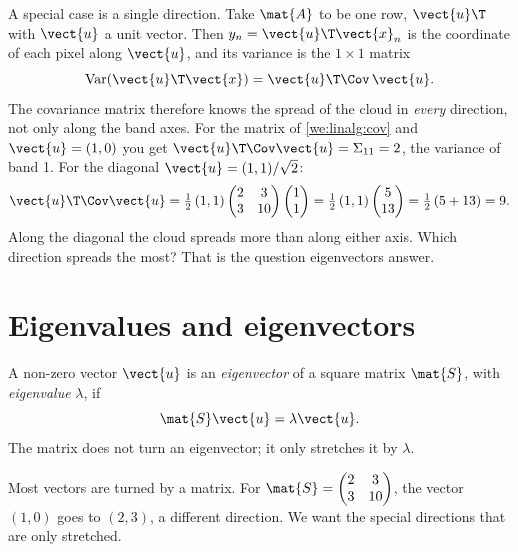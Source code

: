 A special case is a single direction. Take $\mat{A}$ to be one row, $\vect{u}\T$ with $\vect{u}$ a
unit vector. Then $y_n = \vect{u}\T\vect{x}_n$ is the coordinate of each pixel along $\vect{u}$,
and its variance is the $1\times1$ matrix
\begin{equation}\label{eq:linalg:dirvar}
\operatorname{Var}(\vect{u}\T\vect{x}) = \vect{u}\T\Cov\,\vect{u}.
\end{equation}
The covariance matrix therefore knows the spread of the cloud in \emph{every} direction, not only
along the band axes. For the matrix of \cref{we:linalg:cov} and $\vect{u} = (1, 0)$ you get
$\vect{u}\T\Cov\vect{u} = \Sigma_{11} = 2$, the variance of band 1. For the diagonal
$\vect{u} = (1, 1)/\sqrt2$:
\[
\vect{u}\T\Cov\vect{u} = \tfrac12\,(1, 1)\begin{pmatrix} 2 & 3\\ 3 & 10\end{pmatrix}
\begin{pmatrix}1\\1\end{pmatrix} = \tfrac12\,(1, 1)\begin{pmatrix} 5\\ 13\end{pmatrix}
= \tfrac12\,(5 + 13) = 9 .
\]
Along the diagonal the cloud spreads more than along either axis. Which direction spreads the
most? That is the question eigenvectors answer.

\section{Eigenvalues and eigenvectors}\label{sec:linalg:eigen}

\begin{definition}
A non-zero vector $\vect{u}$ is an \emph{eigenvector} of a square matrix $\mat{S}$, with
\emph{eigenvalue} $\lambda$, if
\begin{equation}\label{eq:linalg:eig}
\mat{S}\vect{u} = \lambda\vect{u}.
\end{equation}
The matrix does not turn an eigenvector; it only stretches it by $\lambda$.
\end{definition}

Most vectors are turned by a matrix. For $\mat{S} = \begin{pmatrix} 2 & 3\\ 3 & 10\end{pmatrix}$,
the vector $(1, 0)$ goes to $(2, 3)$, a different direction. We want the special directions that
are only stretched.

